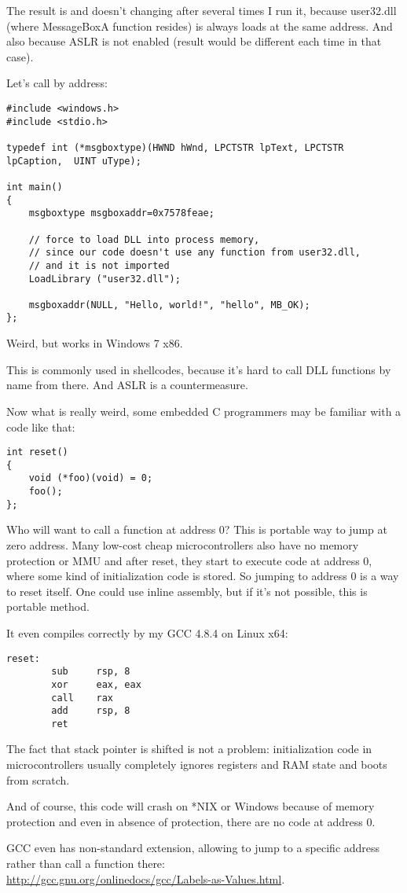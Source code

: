 The result is  and doesn't changing after several times I run it,
because user32.dll (where MessageBoxA function resides) is always loads at the same address.
And also because \ac{ASLR} is not enabled (result would be different each time in that case).

Let's call  by address:

\begin{lstlisting}[style=customc]
#include <windows.h>
#include <stdio.h>

typedef int (*msgboxtype)(HWND hWnd, LPCTSTR lpText, LPCTSTR lpCaption,  UINT uType);

int main()
{
	msgboxtype msgboxaddr=0x7578feae;

	// force to load DLL into process memory, 
	// since our code doesn't use any function from user32.dll, 
	// and it is not imported
	LoadLibrary ("user32.dll");

	msgboxaddr(NULL, "Hello, world!", "hello", MB_OK);
};
\end{lstlisting}

Weird, but works in Windows 7 x86.

This is commonly used in shellcodes, because it's hard to call DLL functions by name from there.
And \ac{ASLR} is a countermeasure.

Now what is really weird, some embedded C programmers may be familiar with a code like that:

\begin{lstlisting}[style=customc]
int reset()
{
	void (*foo)(void) = 0;
	foo();
};
\end{lstlisting}

Who will want to call a function at address 0?
This is portable way to jump at zero address.
Many low-cost cheap microcontrollers also have no memory protection or \ac{MMU} and after reset, they start to execute code at address 0, where some kind of initialization code is stored.
So jumping to address 0 is a way to reset itself.
One could use inline assembly, but if it's not possible, this is portable method.

It even compiles correctly by my GCC 4.8.4 on Linux x64:

\begin{lstlisting}[style=customasmx86]
reset:
        sub     rsp, 8
        xor     eax, eax
        call    rax
        add     rsp, 8
        ret
\end{lstlisting}

The fact that stack pointer is shifted is not a problem: initialization code in microcontrollers usually completely ignores registers and \ac{RAM} state and boots from scratch.

And of course, this code will crash on *NIX or Windows because of memory protection and even in absence of protection, there are no code at address 0.

GCC even has non-standard extension, allowing to jump to a specific address rather than call a function there:\\
\url{http://gcc.gnu.org/onlinedocs/gcc/Labels-as-Values.html}.


